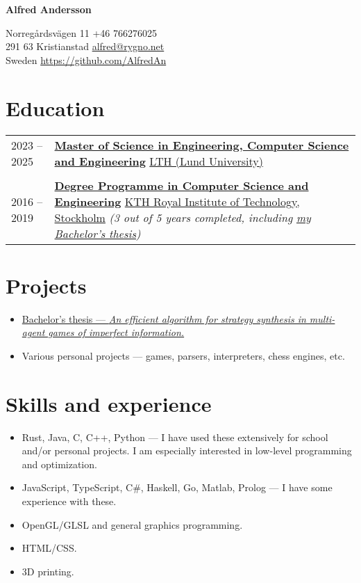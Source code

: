 \documentclass[11pt]{article}
\begin{document}
\begin{center}
     \Huge{\textbf{Alfred Andersson}}
\end{center}
Norregårdsvägen 11 \hfill +46 766276025 \\
291 63 Kristianstad \hfill \href{mailto:alfred@rygno.net}{alfred@rygno.net} \\ 
Sweden \hfill \url{https://github.com/AlfredAn}

\section{Education}
\begin{tabular}{ l p{405pt} }
    2023 -- 2025 & \href{https://www.lth.se/utbildning/datateknik300/}{\textbf{Master of Science in Engineering, Computer Science and Engineering}}
    \newline \href{https://www.lth.se/english/}{LTH (Lund University)} \\ \\

    2016 -- 2019 & \href{https://www.kth.se/utbildning/civilingenjor/datateknik}{\textbf{Degree Programme in Computer Science and Engineering}}
    \newline \href{https://www.kth.se/en}{KTH Royal Institute of Technology, Stockholm}
    \newline \textit{(3 out of 5 years completed, including \href{https://kth.diva-portal.org/smash/record.jsf?pid=diva2\%3A1701708\&dswid=-199}{my Bachelor's thesis})}
\end{tabular}

\section{Projects}
\begin{itemize}
    \item \href{https://kth.diva-portal.org/smash/record.jsf?pid=diva2\%3A1701708\&dswid=-199}{Bachelor's thesis --- \textit{An efficient algorithm for strategy synthesis in multi-agent games of imperfect information.}}
    \item Various personal projects --- games, parsers, interpreters, chess engines, etc.
\end{itemize}

\section{Skills and experience}
\begin{itemize}
    \item Rust, Java, C, C++, Python --- I have used these extensively for school and/or personal projects. I am especially interested in low-level programming and optimization.
    \item JavaScript, TypeScript, C\#, Haskell, Go, Matlab, Prolog --- I have some experience with these.
    \item OpenGL/GLSL and general graphics programming.
    \item HTML/CSS.
    \item 3D printing.
\end{itemize}
\end{document}
